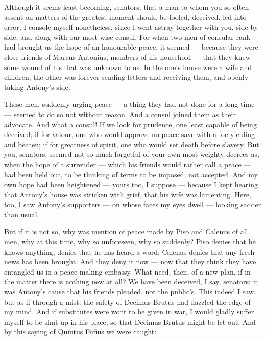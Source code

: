 
 Although it seems least becoming, senators, that a man to whom you so often assent on matters of the greatest moment should be fooled, deceived, led into error, I console myself nonetheless, since I went astray together with you, side by side, and along with our most wise consul. For when two men of consular rank had brought us the hope of an honourable peace, it seemed --- because they were close friends of Marcus Antonius, members of his household --- that they knew some wound of his that was unknown to us. In the one's house were a wife and children; the other was forever sending letters and receiving them, and openly taking Antony's side.

 These men, suddenly urging peace --- a thing they had not done for a long time --- seemed to do so not without reason. And a consul joined them as their advocate. And what a consul! If we look for prudence, one least capable of being deceived; if for valour, one who would approve no peace save with a foe yielding and beaten; if for greatness of spirit, one who would set death before slavery. But you, senators, seemed not so much forgetful of your own most weighty decrees as, when the hope of a surrender --- which his friends would rather call a peace --- had been held out, to be thinking of terms to be imposed, not accepted. And my own hope had been heightened --- yours too, I suppose --- because I kept hearing that Antony's house was stricken with grief, that his wife was lamenting. Here, too, I saw Antony's supporters --- on whose faces my eyes dwell --- looking sadder than usual.

 But if it is not so, why was mention of peace made by Piso and Calenus of all men, why at this time, why so unforeseen, why so suddenly? Piso denies that he knows anything, denies that he has heard a word; Calenus denies that any fresh news has been brought. And they deny it now --- now that they think they have entangled us in a peace-making embassy. What need, then, of a new plan, if in the matter there is nothing new at all? We have been deceived, I say, senators: it was Antony's cause that his friends pleaded, not the public's. This indeed I saw, but as if through a mist: the safety of Decimus Brutus had dazzled the edge of my mind. And if substitutes were wont to be given in war, I would gladly suffer myself to be shut up in his place, so that Decimus Brutus might be let out. And by this saying of Quintus Fufius we were caught:

